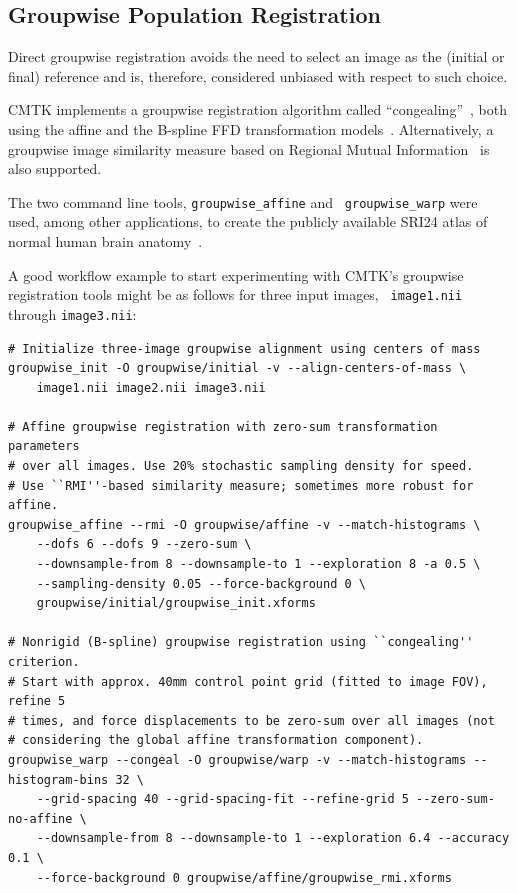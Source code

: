 \documentclass{InsightArticle}
\begin{document}
\subsection{Groupwise Population Registration}

Direct groupwise registration avoids the need to select an image as the
(initial or final) reference and is, therefore, considered unbiased with
respect to such choice.

CMTK implements a groupwise registration algorithm called
``congealing''~\cite{Learned-Miller:2006}, both using the affine and the
B-spline FFD transformation models~\cite{BalcGollShen:2007}. Alternatively, a
groupwise image similarity measure based on Regional Mutual
Information~\cite{RussTomaRohl:2004} is also supported.

  The two command line tools, {\tt groupwise\_affine} and {\tt
groupwise\_warp} were used, among other applications, to create the publicly
available SRI24 atlas  of normal human brain
anatomy~\cite{RohlZahrSull:2008,RohlZahrSull:2010}.

A good workflow example to start experimenting with CMTK's groupwise
registration tools might be as follows for three input images, {\tt
  image1.nii} through {\tt image3.nii}:
\begin{verbatim}
# Initialize three-image groupwise alignment using centers of mass
groupwise_init -O groupwise/initial -v --align-centers-of-mass \
    image1.nii image2.nii image3.nii

# Affine groupwise registration with zero-sum transformation parameters
# over all images. Use 20% stochastic sampling density for speed.
# Use ``RMI''-based similarity measure; sometimes more robust for affine.
groupwise_affine --rmi -O groupwise/affine -v --match-histograms \
    --dofs 6 --dofs 9 --zero-sum \
    --downsample-from 8 --downsample-to 1 --exploration 8 -a 0.5 \
    --sampling-density 0.05 --force-background 0 \
    groupwise/initial/groupwise_init.xforms

# Nonrigid (B-spline) groupwise registration using ``congealing'' criterion.
# Start with approx. 40mm control point grid (fitted to image FOV), refine 5
# times, and force displacements to be zero-sum over all images (not
# considering the global affine transformation component).
groupwise_warp --congeal -O groupwise/warp -v --match-histograms --histogram-bins 32 \
    --grid-spacing 40 --grid-spacing-fit --refine-grid 5 --zero-sum-no-affine \
    --downsample-from 8 --downsample-to 1 --exploration 6.4 --accuracy 0.1 \
    --force-background 0 groupwise/affine/groupwise_rmi.xforms
\end{verbatim}
\end{document}
